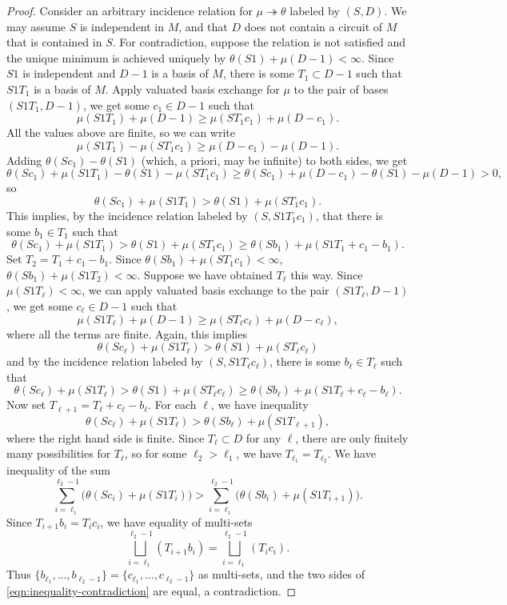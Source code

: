 \documentclass{article}
\theoremstyle{definition}
\newcommand{\onto}{\twoheadrightarrow}
\begin{document}
\begin{proof}
         Consider an arbitrary incidence relation for $\mu\onto\theta$ labeled by $(S,D)$. We may assume $S$ is independent in $M$, and that $D$ does not contain a circuit of $M$ that is contained in $S$. For contradiction, suppose the relation is not satisfied and the unique minimum is achieved uniquely by $\theta(S1)+\mu(D-1)<\infty$. Since $S1$ is independent and $D-1$ is a basis of $M$, there is some $T_1\subset D-1$ such that $S1T_1$ is a basis of $M$. Apply valuated basis exchange for $\mu$ to the pair of bases $(S1T_1,D-1)$, we get some $c_1\in D-1$ such that 
    \[\mu(S1T_1)+\mu(D-1)\geq \mu(ST_1c_1)+\mu(D-c_1).\]
    All the values above are finite, so we can write 
    \[\mu(S1T_1)-\mu(ST_1c_1)\geq \mu(D-c_1)-\mu(D-1).\]
    Adding $\theta(Sc_1)-\theta(S1)$ (which, a priori, may be infinite) to both sides, we get
    \[\theta(Sc_1)+\mu(S1T_1)-\theta(S1)-\mu(ST_1c_1)\geq \theta(Sc_1)+\mu(D-c_1)-\theta(S1)-\mu(D-1)>0,\]
    so 
    \[\theta(Sc_1)+\mu(S1T_1)>\theta(S1)+\mu(ST_1c_1).\]
    This implies, by the incidence relation labeled by $(S,S1T_1c_1)$, that there is some $b_1\in T_1$ such that
    \[\theta(Sc_1)+\mu(S1T_1)>\theta(S1)+\mu(ST_1c_1)\geq \theta(Sb_1)+\mu(S1T_1+c_1-b_1).\]
    Set $T_2=T_1+c_1-b_1$. Since $\theta(Sb_1)+\mu(ST_1c_1)<\infty$, $\theta(Sb_1)+\mu(S1T_2)<\infty$. Suppose we have obtained $T_\ell$ this way. Since $\mu(S1T_\ell)<\infty$, we can apply valuated basis exchange to the pair $(S1T_\ell, D-1)$, we get some $c_\ell\in D-1$ such that 
    \[\mu(S1T_\ell)+\mu(D-1) \geq \mu(ST_\ell c_\ell) + \mu(D-c_\ell),\]
    where all the terms are finite. Again, this implies 
    \[\theta(Sc_\ell)+\mu(S1T_\ell)>\theta(S1)+\mu(ST_\ell c_\ell)\]
    and by the incidence relation labeled by $(S,S1T_\ell c_\ell)$, there is some $b_\ell\in T_\ell$ such that 
    \[\theta(Sc_\ell)+\mu(S1T_\ell)>\theta(S1)+\mu(ST_\ell c_\ell)\geq \theta(Sb_\ell)+\mu(S1T_\ell+c_\ell-b_\ell).\]
    Now set $T_{\ell+1}=T_\ell+c_\ell-b_\ell$. For each $\ell$, we have inequality
    \[\theta(Sc_\ell)+\mu(S1T_\ell)>\theta(Sb_\ell)+\mu(S1T_{\ell+1}),\]
    where the right hand side is finite. Since $T_\ell\subset D$ for any $\ell$, there are only finitely many possibilities for $T_\ell$, so for some $\ell_2>\ell_1$, we have $T_{\ell_1}=T_{\ell_2}$. We have inequality of the sum
    \begin{equation}\label{eqn:inequality-contradiction}
        \sum_{i=\ell_1}^{\ell_2-1}\Big(\theta(Sc_i) + \mu(S1T_i)\Big) > \sum_{i=\ell_1}^{\ell_2-1}\Big(\theta(Sb_i) + \mu(S1T_{i+1})\Big). 
    \end{equation}
    Since $T_{i+1} b_i = T_i c_i$, we have equality of multi-sets
    \[\bigsqcup_{i=\ell_1}^{\ell_2-1}(T_{i+1} b_i) = \bigsqcup_{i=\ell_1}^{\ell_2-1} (T_i c_i).\]
    Thus $\{b_{\ell_1},...,b_{\ell_2-1}\}= \{c_{\ell_1}, ..., c_{\ell_2-1}\}$ as multi-sets, and the two sides of \eqref{eqn:inequality-contradiction} are equal, a contradiction.
\end{proof}
\end{document}
